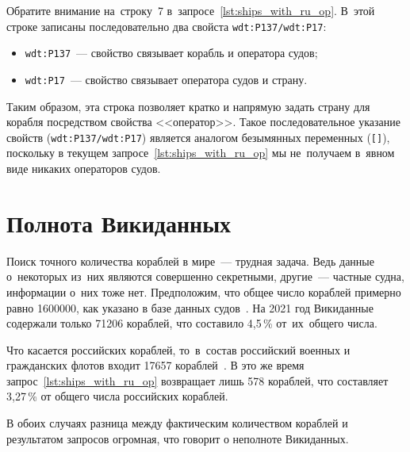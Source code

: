 Обратите внимание на~строку~7 в~запросе~\ref{lst:ships_with_ru_op}. 
В~этой строке записаны последовательно два свойста \texttt{wdt:P137/wdt:P17}:
\begin{itemize}
	\item \texttt{wdt:P137}~--- свойство  связывает корабль и оператора судов;
	\item \texttt{wdt:P17}~--- свойство  связывает оператора судов и страну.
\end{itemize}
Таким образом, эта строка позволяет кратко и напрямую задать страну для корабля 
посредством свойства <<оператор>>. 
Такое последовательное указание свойств (\texttt{wdt:P137/wdt:P17}) 
является аналогом безымянных переменных (\lstinline|[]|),
поскольку в текущем запросе~\ref{lst:ships_with_ru_op} 
мы не~получаем в~явном виде никаких операторов судов. 




\newpage
\section{Полнота Викиданных}

Поиск точного количества кораблей в мире~--- трудная задача. 
Ведь данные о~некоторых из~них являются совершенно секретными, 
другие~--- частные судна, информации о~них тоже нет. 
Предположим, что общее число кораблей примерно равно \num{1600000}, 
как указано в базе данных судов~\autocite{FleetMon}. 
На 2021 год Викиданные содержали только 71206 кораблей, 
что составило 4,5\,\% от~их~общего числа.


Что касается российских кораблей, 
то~в~состав российский военных и гражданских флотов входит \num{17657} кораблей~\autocite{RussianShips}. 
В это же время запрос~\ref{lst:ships_with_ru_op} возвращает лишь 578 кораблей, 
что составляет 3,27\,\% от общего числа российских кораблей. 

В обоих случаях разница между фактическим количеством кораблей и результатом запросов огромная, что говорит о неполноте Викиданных.






